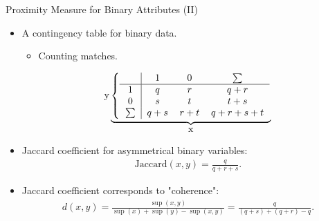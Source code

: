 \begin{frame}{Proximity Measure for Binary Attributes (II)}
	\begin{itemize}
		\item A contingency table for binary data.
		      \begin{itemize}
			      \item Counting matches.
		      \end{itemize}
		      \begin{center}
			      \vspace{-0.2cm}
			      \[
				      \text{y}\underbrace{
					      \left\{\begin{tabular}{ c | c c c }
						             & $1$   & $0$   & $\sum$    \\ \hline
						      $1$    & $q$   & $r$   & $q+r$     \\
						      $0$    & $s$   & $t$   & $t+s$     \\
						      $\sum$ & $q+s$ & $r+t$ & $q+r+s+t$
					      \end{tabular}\right.}_{\let\scriptstyle\textstyle\substack{\text{x}}}
			      \]
		      \end{center}
		\item Jaccard coefficient for asymmetrical binary variables:
		      \begin{align}
			      \text{Jaccard}(x,y) = \frac{q}{q+r+s}.
		      \end{align}
		\item Jaccard coefficient corresponds to "coherence":
		      \begin{align}
			      d(x,y) = \frac{\sup(x,y)}{\sup(x) + \sup(y) - \sup(x,y)} = \frac{q}{(q+s)+(q+r)-q}.
		      \end{align}
	\end{itemize}
\end{frame}

